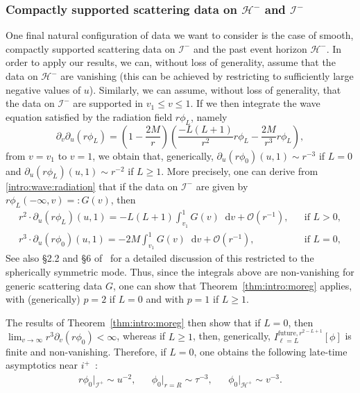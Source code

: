 \documentclass[11pt,english]{article}
\numberwithin{equation}{section}
\theoremstyle{remark}
\theoremstyle{plain}
\theoremstyle{remark}
\newcommand{\dd}{\mathop{}\!\mathrm{d}}
\newcommand{\pu}{\partial_u}
\newcommand{\pv}{\partial_v}
\renewcommand{\(}{\left(}
\renewcommand{\)}{\right)}
\begin{document}
\subsubsection{Compactly supported scattering data on \texorpdfstring{$\mathcal H^-$}{H-} and \texorpdfstring{$\mathcal I^-$}{I-}}\label{intro:subsecNP3}
One final natural configuration of data we want to consider is the case of smooth, compactly supported scattering data on $\mathcal I^-$ and the past event horizon $\mathcal H^-$. 
In order to apply our results, we can, without loss of generality, assume that the data on $\mathcal H^-$ are vanishing (this can be achieved by restricting to sufficiently large negative values of $u$). 
Similarly, we can assume, without loss of generality, that the data on $\mathcal I^-$ are supported in $v_1\leq v\leq 1$. If we then integrate the wave equation satisfied by the radiation field $r\phi_L$, namely
\begin{equation}\label{intro:wave:radiation}
\pv\pu(r\phi_L)=\left(1-\frac{2M}{r}\right)\left(\frac{-L(L+1)}{r^2}r\phi_L-\frac{2M}{r^3}r\phi_L\right),
\end{equation}
from $v=v_1$ to $v=1$, we obtain that, generically, $\pu(r\phi_0)(u,1)\sim r^{-3}$ if $L=0$ and  $\pu(r\phi_L)(u,1)\sim r^{-2}$ if $L\geq 1$.  
More precisely, one can derive from \eqref{intro:wave:radiation} that if the data on $\mathcal I^-$ are given by $r\phi_L(-\infty,v)=:G(v)$, then 
\begin{align*}
r^2\cdot \pu(r\phi_L)(u,1)=-L(L+1)\int_{v_1}^1 G(v)\dd v+\mathcal O(r^{-1}), &&\text{if } L>0,\\
r^3\cdot \pu(r\phi_0)(u,1)=-2M\int_{v_1}^1 G(v)\dd v+\mathcal O(r^{-1}), &&\text{if } L=0,
\end{align*}
See also  \S 2.2 and \S 6 of~\cite{I} for a detailed discussion of this restricted to the spherically symmetric mode.
Thus, since the integrals above are non-vanishing for generic scattering data $G$, one can show that Theorem~\ref{thm:intro:moreg} applies, with (generically) $p=2$ if $L=0$ and with $p=1$ if $L\geq 1$.

 The results of Theorem~\ref{thm:intro:moreg} then show that if $L=0$, then $\lim_{v\to\infty}r^3\pv(r\phi_0)<\infty$, whereas if $L\geq 1$, then, generically, $I_{\ell=L}^{\mathrm{future},r^{2-L+1}}[\phi]$ is finite and non-vanishing. 
 Therefore, if $L=0$, one obtains the following late-time asymptotics near $i^+$~\cite{AAG21}:
\begin{align}
r\phi_0|_{\mathcal{I}^+}\sim u^{-2}, &&\phi_0|_{r=R}\sim \tau^{-3},&& \phi_0|_{\mathcal{H}^+}\sim v^{-3}.
\end{align}
\end{document}
